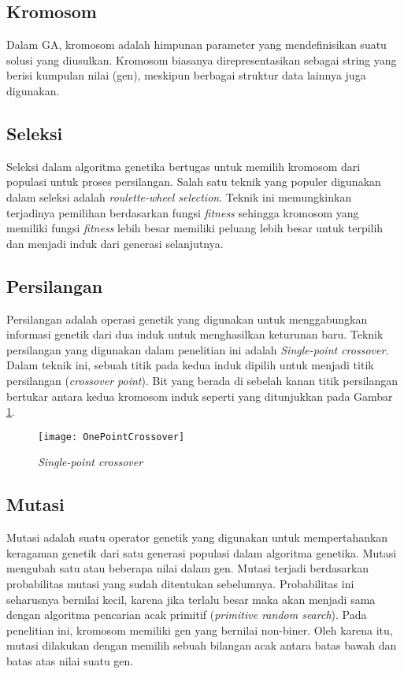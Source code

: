 \subsection{Kromosom}
\label{sub:chromosome}
Dalam GA, kromosom adalah himpunan parameter yang mendefinisikan suatu solusi yang diusulkan. Kromosom biasanya direpresentasikan sebagai string yang berisi kumpulan nilai (gen), meskipun berbagai struktur data lainnya juga digunakan.

\subsection{Seleksi}
\label{sub:selection}
Seleksi dalam algoritma genetika bertugas untuk memilih kromosom dari populasi untuk proses persilangan. Salah satu teknik yang populer digunakan dalam seleksi adalah \textit{roulette-wheel selection}. Teknik ini memungkinkan terjadinya pemilihan berdasarkan fungsi \textit{fitness} sehingga kromosom yang memiliki fungsi \textit{fitness} lebih besar memiliki peluang lebih besar untuk terpilih dan menjadi induk dari generasi selanjutnya.

\subsection{Persilangan}
\label{sub:crossover}
Persilangan adalah operasi genetik yang digunakan untuk menggabungkan informasi genetik dari dua induk untuk menghasilkan keturunan baru. Teknik persilangan yang digunakan dalam penelitian ini adalah \textit{Single-point crossover}. Dalam teknik ini, sebuah titik pada kedua induk dipilih untuk menjadi titik persilangan (\textit{crossover point}). Bit yang berada di sebelah kanan titik persilangan bertukar antara kedua kromosom induk seperti yang ditunjukkan pada Gambar \ref{fig:spcrossover}.

\begin{figure}[h]
	\begin{center}
		\texttt{[image: OnePointCrossover]}
		\caption{\textit{Single-point crossover}}
		\label{fig:spcrossover}
	\end{center}
\end{figure}

\subsection{Mutasi}
\label{sub:mutation}
Mutasi adalah suatu operator genetik yang digunakan untuk mempertahankan keragaman genetik dari satu generasi populasi dalam algoritma genetika. Mutasi mengubah satu atau beberapa nilai dalam gen. Mutasi terjadi berdasarkan probabilitas mutasi yang sudah ditentukan sebelumnya. Probabilitas ini seharusnya bernilai kecil, karena jika terlalu besar maka akan menjadi sama dengan algoritma pencarian acak primitif (\textit{primitive random search}). Pada penelitian ini, kromosom memiliki gen yang bernilai non-biner. Oleh karena itu, mutasi dilakukan dengan memilih sebuah bilangan acak antara batas bawah dan batas atas nilai suatu gen.

